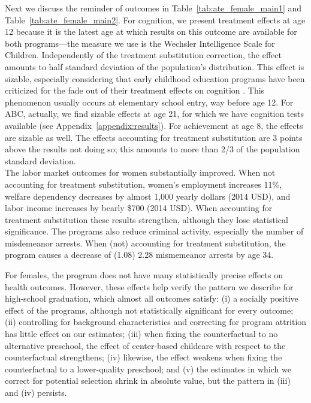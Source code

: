 \noindent Next we discuss the reminder of outcomes in Table~\ref{tab:ate_female_main1} and Table~\ref{tab:ate_female_main2}. For cognition, we present treatment effects at age 12 because it is the latest age at which results on this outcome are available for both programs---the measure we use is the Wechsler Intelligence Scale for Children. Independently of the treatment substitution correction, the effect amounts to half standard deviation of the population's distribution. This effect is sizable, especially considering that early childhood education programs have been criticized for the fade out of their treatment effects on cognition \citep{Elango_Hojman_etal_2015_Early-Edu}. This phenomenon usually occurs at elementary school entry, way before age 12. For ABC, actually, we find sizable effects at age 21, for which we have cognition tests available (see Appendix~\ref{appendix:results}). For achievement at age 8, the effects are sizable as well. The effects accounting for treatment substitution are 3 points above the results not doing so; this amounts to more than 2/3 of the population standard deviation.\\

\noindent The labor market outcomes for women substantially improved. When not accounting for treatment substitution, women's employment increases 11\%, welfare dependency decreases by almost 1,000 yearly dollars (2014 USD), and labor income increases by bearly \$700 (2014 USD). When accounting for treatment substitution these results strengthen, although they lose statistical significance. The programs also reduce criminal activity, especially the number of misdemeanor arrests. When (not) accounting for treatment substitution, the program causes a decrease of (1.08) 2.28 mismemeanor arrests by age 34.

\noindent For females, the program does not have many statistically precise effects on health outcomes. However, these effects help verify the pattern we describe for high-school graduation, which almost all outcomes satisfy: (i) a socially positive effect of the programs, although not statistically significant for every outcome; (ii) controlling for background characteristics and correcting for program attrition has little effect on our estimates; (iii) when fixing the counterfactual to no alternative preschool, the effect of center-based childcare with respect to the counterfactual strengthens; (iv) likewise, the effect weakens when fixing the counterfactual to a lower-quality preschool; and (v) the estimates in which we correct for potential selection shrink in absolute value, but the pattern in (iii) and (iv) persists.\\

